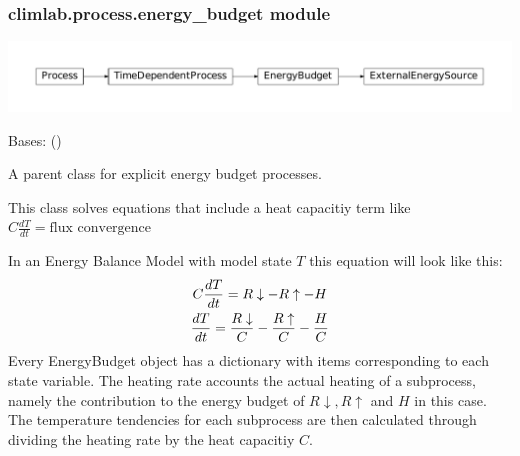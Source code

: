 \documentclass[a4paper,10pt,english]{sphinxmanual}
\begin{document}
\subsubsection{climlab.process.energy\_budget module}
\label{api/climlab.process:climlab-process-energy-budget-module}
\includegraphics{inheritance-98fc96005ebee865666017a7ff9a04cb383ee609.pdf}
\label{api/climlab.process:module-climlab.process.energy_budget}

\begin{fulllineitems}
\label{api/climlab.process:climlab.process.energy_budget.EnergyBudget}
Bases: {\hyperref[api/climlab.process:climlab.process.time_dependent_process.TimeDependentProcess]{\emph{}}} ()

A parent class for explicit energy budget processes.

This class solves equations that include a heat capacitiy term like
\(C \frac{dT}{dt} = \textrm{flux convergence}\)

In an Energy Balance Model with model state \(T\) this equation 
will look like this:
\begin{gather}
\begin{split}C \frac{dT}{dt} = R\downarrow - R\uparrow - H  \end{split}\notag\\\begin{split}\frac{dT}{dt} = \frac{R\downarrow}{C} - \frac{R\uparrow}{C} - \frac{H}{C}\end{split}\notag
\end{gather}
Every EnergyBudget object has a  dictionary with items 
corresponding to each state variable. The heating rate accounts the actual 
heating of a subprocess, namely the contribution to the energy budget 
of \(R\downarrow, R\uparrow\) and \(H\) in this case.
The temperature tendencies for each subprocess are then calculated 
through dividing the heating rate by the heat capacitiy \(C\).


\end{fulllineitems}
\end{document}
